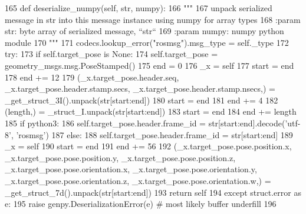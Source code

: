 \begin{DoxyCode}
165   \textcolor{keyword}{def }deserialize\_numpy(self, str, numpy):
166     \textcolor{stringliteral}{"""}
167 \textcolor{stringliteral}{    unpack serialized message in str into this message instance using numpy for array types}
168 \textcolor{stringliteral}{    :param str: byte array of serialized message, ``str``}
169 \textcolor{stringliteral}{    :param numpy: numpy python module}
170 \textcolor{stringliteral}{    """}
171     codecs.lookup\_error(\textcolor{stringliteral}{"rosmsg"}).msg\_type = self.\_type
172     \textcolor{keywordflow}{try}:
173       \textcolor{keywordflow}{if} self.target\_pose \textcolor{keywordflow}{is} \textcolor{keywordtype}{None}:
174         self.target\_pose = geometry\_msgs.msg.PoseStamped()
175       end = 0
176       \_x = self
177       start = end
178       end += 12
179       (\_x.target\_pose.header.seq, \_x.target\_pose.header.stamp.secs, \_x.target\_pose.header.stamp.nsecs,) = 
      \_get\_struct\_3I().unpack(str[start:end])
180       start = end
181       end += 4
182       (length,) = \_struct\_I.unpack(str[start:end])
183       start = end
184       end += length
185       \textcolor{keywordflow}{if} python3:
186         self.target\_pose.header.frame\_id = str[start:end].decode(\textcolor{stringliteral}{'utf-8'}, \textcolor{stringliteral}{'rosmsg'})
187       \textcolor{keywordflow}{else}:
188         self.target\_pose.header.frame\_id = str[start:end]
189       \_x = self
190       start = end
191       end += 56
192       (\_x.target\_pose.pose.position.x, \_x.target\_pose.pose.position.y, \_x.target\_pose.pose.position.z, 
      \_x.target\_pose.pose.orientation.x, \_x.target\_pose.pose.orientation.y, \_x.target\_pose.pose.orientation.z, 
      \_x.target\_pose.pose.orientation.w,) = \_get\_struct\_7d().unpack(str[start:end])
193       \textcolor{keywordflow}{return} self
194     \textcolor{keywordflow}{except} struct.error \textcolor{keyword}{as} e:
195       \textcolor{keywordflow}{raise} genpy.DeserializationError(e)  \textcolor{comment}{# most likely buffer underfill}
196 
\end{DoxyCode}
\mbox{\label{classexp__assignment2_1_1msg_1_1__PlanningGoal_1_1PlanningGoal_a1bcb2dd555433aea2e0bc0516ccdee31}} 

